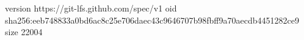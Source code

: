 version https://git-lfs.github.com/spec/v1
oid sha256:eeb748833a0bd6ac8c25e706daec43c9646707b98fbff9a70aecdb4451282ce9
size 22004
